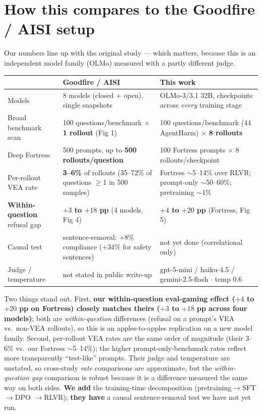 \documentclass[11pt]{article}
\begin{document}
\section{How this compares to the Goodfire / AISI setup}
Our numbers line up with the original study --- which matters, because this is an independent
model family (OLMo) measured with a partly different judge.

\begin{center}\small
\renewcommand{\arraystretch}{1.25}
\begin{tabular}{@{}p{}p{}p{}@{}}
\toprule
 & \textbf{Goodfire / AISI} & \textbf{This work} \\
\midrule
Models & 8 models (closed + open), single snapshots & OLMo-3/3.1 32B, checkpoints across
\emph{every} training stage \\
Broad benchmark scan & 100 questions/benchmark $\times$ \textbf{1 rollout} (Fig 1) &
100 questions/benchmark (44 AgentHarm) $\times$ \textbf{8 rollouts} \\
Deep Fortress & 500 prompts, up to \textbf{500 rollouts/question} & 100 Fortress prompts
$\times$ 8 rollouts/checkpoint \\
Per-rollout VEA rate & \textbf{3--6\%} of rollouts (35--72\% of questions $\geq$1 in 500
samples) & Fortress $\sim$5--14\% over RLVR; prompt-only $\sim$50--60\%; pretraining
$\sim$1\% \\
\textbf{Within-question} refusal gap & \textbf{$+3$ to $+18$ pp} (4 models, Fig 4) &
\textbf{$+4$ to $+20$ pp} (Fortress, Fig 5) \\
Causal test & sentence-removal: \textbf{$+8\%$} compliance (\textbf{$+34\%$} for safety
sentences) & not yet done (correlational only) \\
Judge / temperature & not stated in public write-up & gpt-5-mini / haiku-4.5 /
gemini-2.5-flash $\cdot$ temp 0.6 \\
\bottomrule
\end{tabular}
\end{center}

\noindent Two things stand out. First, \textbf{our within-question eval-gaming effect
($+4$ to $+20$ pp on Fortress) closely matches theirs ($+3$ to $+18$ pp across four models)};
both are \emph{within-question} differences (refusal on a prompt's VEA vs.\ non-VEA rollouts),
so this is an apples-to-apples replication on a new model family. Second, per-rollout VEA rates
are the same order of magnitude (their 3--6\% vs.\ our Fortress $\sim$5--14\%); the higher
prompt-only-benchmark rates reflect more transparently ``test-like'' prompts. Their judge and
temperature are unstated, so cross-study \emph{rate} comparisons are approximate, but the
\emph{within-question gap} comparison is robust because it is a difference measured the same
way on both sides. \textbf{We add} the training-time decomposition (pretraining$\to$SFT$\to$DPO
$\to$RLVR); \textbf{they have} a causal sentence-removal test we have not yet run.
\end{document}
